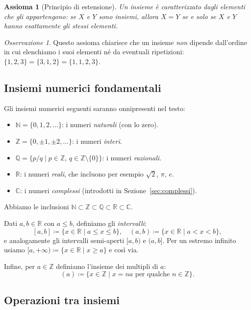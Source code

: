 \documentclass[11pt, a4paper]{book}
\theoremstyle{definition}
\theoremstyle{plain}
\newtheorem{assioma}[definizione]{Assioma}
\theoremstyle{remark}
\newtheorem{osservazione}[definizione]{Osservazione}
\newcommand{\N}{\mathbb{N}}
\newcommand{\Z}{\mathbb{Z}}
\newcommand{\Q}{\mathbb{Q}}
\newcommand{\R}{\mathbb{R}}
\newcommand{\C}{\mathbb{C}}
\begin{document}
\begin{defbox}
\begin{assioma}[Principio di estensione]
Un insieme è caratterizzato dagli elementi che gli appartengono: se $X$ e $Y$ sono insiemi, allora $X = Y$ se e solo se $X$ e $Y$ hanno esattamente gli stessi elementi.
\end{assioma}
\end{defbox}

\begin{osservazione}
Questo assioma chiarisce che un insieme \emph{non} dipende dall'ordine in cui elenchiamo i suoi elementi né da eventuali ripetizioni: $\{1, 2, 3\} = \{3, 1, 2\} = \{1, 1, 2, 3\}$.
\end{osservazione}

\subsection{Insiemi numerici fondamentali}

Gli insiemi numerici seguenti saranno onnipresenti nel testo:
\begin{itemize}
  \item $\N = \{0, 1, 2, \ldots\}$: i numeri \emph{naturali} (con lo zero).
  \item $\Z = \{0, \pm 1, \pm 2, \ldots\}$: i numeri \emph{interi}.
  \item $\Q = \{p/q \mid p \in \Z,\, q \in \Z \setminus \{0\}\}$: i numeri \emph{razionali}.
  \item $\R$: i numeri \emph{reali}, che incluono per esempio $\sqrt{2}$, $\pi$, $e$.
  \item $\C$: i numeri \emph{complessi} (introdotti in Sezione~\ref{sec:complessi}).
\end{itemize}

Abbiamo le inclusioni $\N \subset \Z \subset \Q \subset \R \subset \C$.

\medskip
Dati $a, b \in \R$ con $a \leq b$, definiamo gli \emph{intervalli}:
\[
  [a,b] \coloneqq \{x \in \R \mid a \leq x \leq b\}, \quad
  (a,b) \coloneqq \{x \in \R \mid a < x < b\},
\]
e analogamente gli intervalli semi-aperti $[a,b)$ e $(a,b]$. Per un estremo infinito usiamo $[a,+\infty) \coloneqq \{x \in \R \mid x \geq a\}$ e così via.

Infine, per $a \in \Z$ definiamo l'insieme dei multipli di $a$:
\[
  (a) \coloneqq \{x \in \Z \mid x = na \text{ per qualche } n \in \Z\}.
\]

\subsection{Operazioni tra insiemi}
\end{document}
